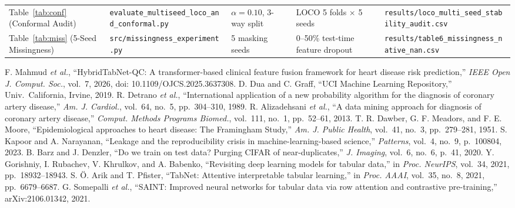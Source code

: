 \documentclass[journal]{IEEEtran}
\begin{document}
\begin{table}[t]
\begin{tabular}{lllll}
Table~\ref{tab:conf} (Conformal Audit) & \texttt{evaluate\_multiseed\_loco\_and\_conformal.py} & $\alpha=0.10$, 3-way split & LOCO 5 folds $\times$ 5 seeds & \texttt{results/loco\_multi\_seed\_stability_audit.csv}\\
Table~\ref{tab:miss} (5-Seed Missingness) & \texttt{src/missingness\_experiment.py} & 5 masking seeds & 0--50\% test-time feature dropout & \texttt{results/table6\_missingness\_native\_nan.csv}\\
\bottomrule
\end{tabular}
\end{table}

\begin{thebibliography}{99}
 F. Mahmud \emph{et al.}, ``HybridTabNet-QC: A transformer-based clinical feature fusion framework for heart disease risk prediction,'' \emph{IEEE Open J. Comput. Soc.}, vol.~7, 2026, doi: 10.1109/OJCS.2025.3637308.
 D. Dua and C. Graff, ``UCI Machine Learning Repository,'' Univ.\ California, Irvine, 2019.
 R. Detrano \emph{et al.}, ``International application of a new probability algorithm for the diagnosis of coronary artery disease,'' \emph{Am. J. Cardiol.}, vol.~64, no.~5, pp.~304--310, 1989.
 R. Alizadehsani \emph{et al.}, ``A data mining approach for diagnosis of coronary artery disease,'' \emph{Comput. Methods Programs Biomed.}, vol.~111, no.~1, pp.~52--61, 2013.
 T. R. Dawber, G. F. Meadors, and F. E. Moore, ``Epidemiological approaches to heart disease: The Framingham Study,'' \emph{Am. J. Public Health}, vol.~41, no.~3, pp.~279--281, 1951.
 S. Kapoor and A. Narayanan, ``Leakage and the reproducibility crisis in machine-learning-based science,'' \emph{Patterns}, vol.~4, no.~9, p.~100804, 2023.
 B. Barz and J. Denzler, ``Do we train on test data? Purging CIFAR of near-duplicates,'' \emph{J. Imaging}, vol.~6, no.~6, p.~41, 2020.
 Y. Gorishniy, I. Rubachev, V. Khrulkov, and A. Babenko, ``Revisiting deep learning models for tabular data,'' in \emph{Proc. NeurIPS}, vol.~34, 2021, pp.~18932--18943.
 S. {\"O}. Arik and T. Pfister, ``TabNet: Attentive interpretable tabular learning,'' in \emph{Proc. AAAI}, vol.~35, no.~8, 2021, pp.~6679--6687.
 G. Somepalli \emph{et al.}, ``SAINT: Improved neural networks for tabular data via row attention and contrastive pre-training,'' arXiv:2106.01342, 2021.

\end{thebibliography}
\end{document}
